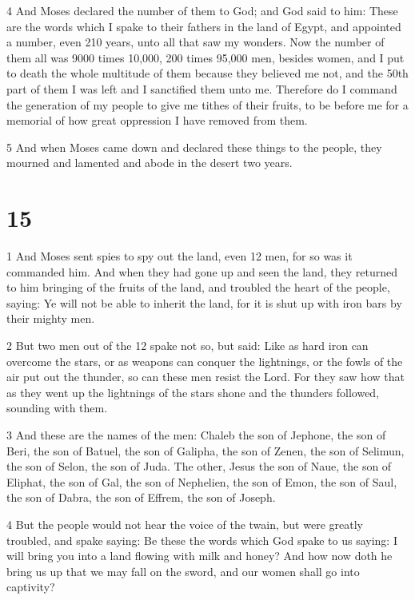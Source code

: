\par 4 And Moses declared the number of them to God; and God said to him: These are the words which I spake to their fathers in the land of Egypt, and appointed a number, even 210 years, unto all that saw my wonders. Now the number of them all was 9000 times 10,000, 200 times 95,000 men, besides women, and I put to death the whole multitude of them because they believed me not, and the 50th part of them I was left and I sanctified them unto me. Therefore do I command the generation of my people to give me tithes of their fruits, to be before me for a memorial of how great oppression I have removed from them. 

\par 5 And when Moses came down and declared these things to the people, they mourned and lamented and abode in the desert two years.

\chapter{15}

\par 1 And Moses sent spies to spy out the land, even 12 men, for so was it commanded him. And when they had gone up and seen the land, they returned to him bringing of the fruits of the land, and troubled the heart of the people, saying: Ye will not be able to inherit the land, for it is shut up with iron bars by their mighty men. 

\par 2 But two men out of the 12 spake not so, but said: Like as hard iron can overcome the stars, or as weapons can conquer the lightnings, or the fowls of the air put out the thunder, so can these men resist the Lord. For they saw how that as they went up the lightnings of the stars shone and the thunders followed, sounding with them. 

\par 3 And these are the names of the men: Chaleb the son of Jephone, the son of Beri, the son of Batuel, the son of Galipha, the son of Zenen, the son of Selimun, the son of Selon, the son of Juda. The other, Jesus the son of Naue, the son of Eliphat, the son of Gal, the son of Nephelien, the son of Emon, the son of Saul, the son of Dabra, the son of Effrem, the son of Joseph. 

\par 4 But the people would not hear the voice of the twain, but were greatly troubled, and spake saying: Be these the words which God spake to us saying: I will bring you into a land flowing with milk and honey? And how now doth he bring us up that we may fall on the sword, and our women shall go into captivity? 

